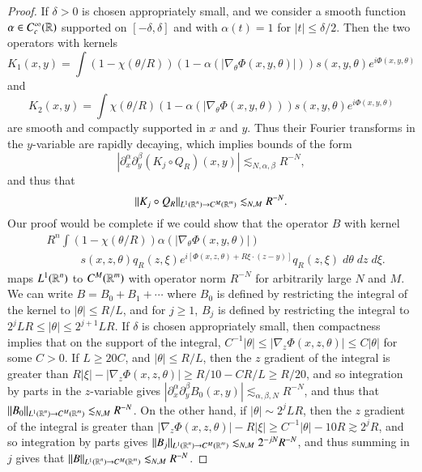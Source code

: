 \begin{proof}
  If $\delta > 0$ is chosen appropriately small, and we consider a smooth function $\alpha \in C_c^\infty(\operatorname{\mathbb{R}})$ supported on $[-\delta,\delta]$ and with $\alpha(t) = 1$ for $|t| \leq \delta/2$. Then the two operators with kernels
  \begin{equation}
    K_1(x,y) = \int (1 - \chi(\theta / R)) (1 - \alpha( |\nabla_\theta \Phi(x,y,\theta)| )) s(x,y,\theta) e^{i \Phi(x,y,\theta)}
  \end{equation}
  and
  \begin{equation}
    K_2(x,y) = \int \chi(\theta / R) (1 - \alpha( |\nabla_\theta \Phi(x,y,\theta) )) s(x,y,\theta) e^{i \Phi(x,y,\theta)}
  \end{equation}
  are smooth and compactly supported in $x$ and $y$. Thus their Fourier transforms in the $y$-variable are rapidly decaying, which implies bounds of the form
  \begin{equation}
    |\partial_x^\alpha \partial_y^\beta ( K_j \circ Q_R )(x,y)| \lesssim_{N,\alpha,\beta} R^{-N},
  \end{equation}
  and thus that
  \begin{equation}
    \| K_j \circ Q_R \|_{L^1(\operatorname{\mathbb{R}}^n) \to C^M(\operatorname{\mathbb{R}}^m)} \lesssim_{N,M} R^{-N}.
  \end{equation}
  Our proof would be complete if we could show that the operator $B$ with kernel
  \begin{equation}
  \begin{split}
    &R^n \int (1 - \chi(\theta / R)) \alpha( |\nabla_\theta \Phi(x,y,\theta)| ) \\
    &\quad\quad\quad s(x,z,\theta) q_R(z,\xi) e^{i [\Phi(x,z,\theta) + R \xi \cdot (z - y)]} q_R(z,\xi)\; d\theta\; dz\; d\xi.
  \end{split}
  \end{equation}
  maps $L^1(\operatorname{\mathbb{R}}^n)$ to $C^M(\operatorname{\mathbb{R}}^m)$ with operator norm $R^{-N}$ for arbitrarily large $N$ and $M$. We can write $B = B_0 + B_1 + \cdots$ where $B_0$ is defined by restricting the integral of the kernel to $|\theta| \leq R/L$, and for $j \geq 1$, $B_j$ is defined by restricting the integral to $2^jLR \leq |\theta| \leq 2^{j+1} LR$. If $\delta$ is chosen appropriately small, then compactness implies that on the support of the integral, $C^{-1} |\theta| \leq |\nabla_z \Phi(x,z,\theta)| \leq C|\theta|$ for some $C > 0$. If $L \geq 20 C$, and $|\theta| \leq R/L$, then the $z$ gradient of the integral is greater than $R |\xi| - |\nabla_z \Phi(x,z,\theta)| \geq R/10 - CR/L \geq R/20$, and so integration by parts in the $z$-variable gives $|\partial_x^\alpha \partial_y^\beta B_0(x,y)| \lesssim_{\alpha,\beta,N} R^{-N}$, and thus that $\| B_0 \|_{L^1(\operatorname{\mathbb{R}}^n) \to C^M(\operatorname{\mathbb{R}}^m)} \lesssim_{N,M} R^{-N}$. On the other hand, if $|\theta| \sim 2^j LR$, then the $z$ gradient of the integral is greater than $|\nabla_z \Phi(x,z,\theta)| - R |\xi| \geq C^{-1} |\theta| - 10 R \gtrsim 2^j R$, and so integration by parts gives $\| B_j \|_{L^1(\operatorname{\mathbb{R}}^n) \to C^M(\operatorname{\mathbb{R}}^m)} \lesssim_{N,M} 2^{-jN} R^{-N}$, and thus summing in $j$ gives that $\| B \|_{L^1(\operatorname{\mathbb{R}}^n) \to C^M(\operatorname{\mathbb{R}}^m)} \lesssim_{N,M} R^{-N}$.
\end{proof}
